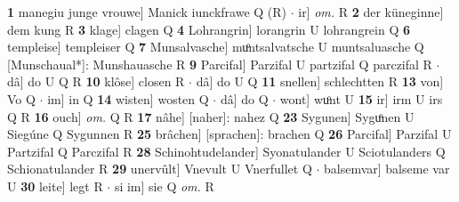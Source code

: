 \documentclass[8pt,a4paper,notitlepage]{article}
\begin{document}
\begin{table}[ht]
\begin{minipage}[t]{0.5\linewidth}
\textbf{1} manegiu junge vrouwe] Manick iunckfrawe Q (R)  $\cdot$ ir] \textit{om.} R \textbf{2} der küneginne] dem kung R \textbf{3} klage] clagen Q \textbf{4} Lohrangrin] lorangrin U lohrangrein Q \textbf{6} templeise] templeiser Q \textbf{7} Munsalvasche] muͦntsalvatsche U muntsaluasche Q [Munschaual*]: Munshauasche R \textbf{9} Parcifal] Parzifal U partzifal Q parczifal R  $\cdot$ dâ] do U Q R \textbf{10} klôse] closen R  $\cdot$ dâ] do U Q \textbf{11} snellen] schlechtten R \textbf{13} von] Vo Q  $\cdot$ im] in Q \textbf{14} wisten] wosten Q  $\cdot$ dâ] do Q  $\cdot$ wont] wuͦnt U \textbf{15} ir] irm U irs Q R \textbf{16} ouch] \textit{om.} Q R \textbf{17} nâhe] [naher]: nahez Q \textbf{23} Sygunen] Syguͦnen U Siegúne Q Sygunnen R \textbf{25} brâchen] [sprachen]: brachen Q \textbf{26} Parcifal] Parzifal U Partzifal Q Parczifal R \textbf{28} Schinohtudelander] Syonatulander U Sciotulanders Q Schionatulander R \textbf{29} unervûlt] Vnevult U Vnerfullet Q  $\cdot$ balsemvar] balseme var U \textbf{30} leite] legt R  $\cdot$ si im] sie Q \textit{om.} R \newline
\end{minipage}
\end{table}
\end{document}
